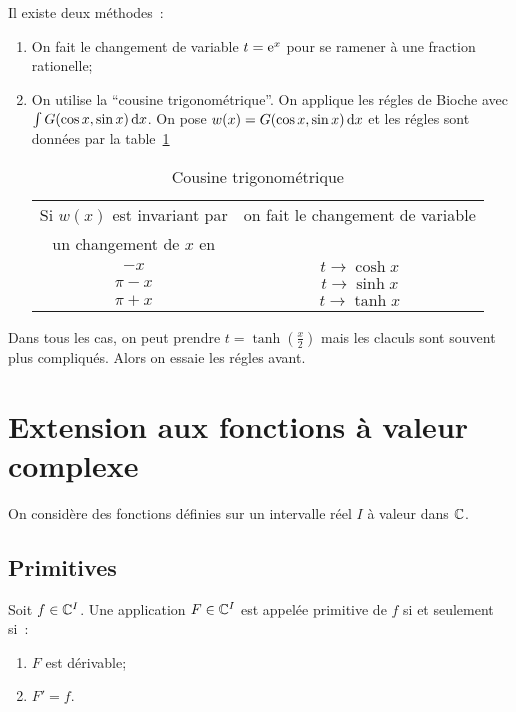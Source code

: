 Il existe deux méthodes~:
\begin{enumerate}
  \item On fait le changement de variable \(t = \operatorname{e}^x\) pour se ramener à une 
    fraction rationelle;
  \item On utilise la ``cousine trigonométrique''. On applique les régles de 
    Bioche avec \(\int G(\cos x,\sin x)\mathop{}\mathopen{}\mathrm{d} x\). On pose \(w(x) = G(\cos x,\sin 
    x) \mathop{}\mathopen{}\mathrm{d} x\) et les régles sont données par la table~\ref{tab:cousinetrigo}

    \begin{table}[!h]
      \centering
      \begin{tabular}{|c|c|}\hline
        Si \(w(x)\) est invariant par & on fait le changement de variable \\
        un changement de \(x\) en &  \\ \hline
        \(-x\) & \(t \to \cosh x\)\\
        \(\pi-x\) & \(t \to \sinh x\)\\
        \(\pi+x\) & \(t \to \tanh x\)\\
      \hline\end{tabular}
      \caption{Cousine trigonométrique}
      \label{tab:cousinetrigo}
    \end{table}
\end{enumerate}

Dans tous les cas, on peut prendre \(t = \tanh\left(\frac{x}{2}\right)\) mais les 
claculs sont souvent plus compliqués. Alors on essaie les régles avant.

\section{Extension aux fonctions à valeur complexe}

On considère des fonctions définies sur un intervalle réel \(I\) à valeur dans 
\(\mathbb{C}\).

\subsection{Primitives}

\begin{defdef}
  Soit \(f \in \mathbb{C}^I\). Une application \(F \in \mathbb{C}^I\) est appelée primitive de 
  \(f\) si et seulement si~:
  \begin{enumerate}
    \item \(F\) est dérivable;
    \item \(F' = f\).
  \end{enumerate}
\end{defdef}

